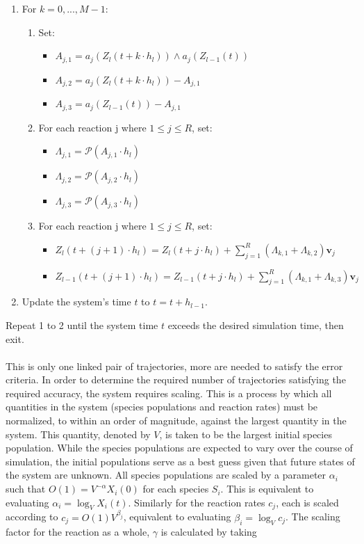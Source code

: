 \documentclass[ugrad,lot,lof,openright,11pt,oneside,onehalfspace]{RUthesis}
\begin{document}
		\begin{enumerate}
			\item For $k = 0,...,M-1$:
				\begin{enumerate}
				\item Set:
					\begin{itemize}
					\item $A_{j,1} = a_j(Z_l(t + k \cdot h_l)) \wedge a_j(Z_{l-1}(t))$
					\item $A_{j,2} = a_j(Z_l(t + k \cdot h_l)) - A_{j,1}$
					\item $A_{j,3} = a_j(Z_{l-1}(t)) - A_{j,1}$
					\end{itemize}
				\item For each reaction j where $1 \leq j \leq R$, set:
					\begin{itemize}
					\item $\Lambda_{j,1} = \mathcal{P}(A_{j,1} \cdot h_l)$
					\item $\Lambda_{j,2} = \mathcal{P}(A_{j,2} \cdot h_l)$
					\item $\Lambda_{j,3} = \mathcal{P}(A_{j,3} \cdot h_l)$
					\end{itemize}
				\item For each reaction j where $1 \leq j \leq R$, set:
					\begin{itemize}
					\item $Z_l(t + (j+1) \cdot h_l) = Z_l(t + j \cdot h_l) + \sum_{j=1}^R (\Lambda_{k,1} + \Lambda_{k,2}) \mathbf{v}_j$
					\item $Z_{l-1}(t + (j+1) \cdot h_l) = Z_{l-1}(t + j \cdot h_l) + \sum_{j=1}^R (\Lambda_{k,1} + \Lambda_{k,3}) \mathbf{v}_j$
					\end{itemize}
				\end{enumerate}
			\item Update the system's time $t$ to $t = t + h_{l-1}$.
		\end{enumerate}

		\noindent
		Repeat 1 to 2 until the system time $t$ exceeds the desired simulation time, then exit.\\
		\\
		This is only one linked pair of trajectories, more are needed to satisfy the error criteria. In order to determine the required number of trajectories satisfying the required accuracy, the system requires scaling. This is a process by which all quantities in the system (species populations and reaction rates) must be normalized, to within an order of magnitude, against the largest quantity in the system. This quantity, denoted by $V$, is taken to be the largest initial species population. While the species populations are expected to vary over the course of simulation, the initial populations serve as a best guess given that future states of the system are unknown. All species populations are scaled by a parameter $\alpha_i$ such that $O(1) = V^{-\alpha} X_i(0)$ for each species $S_i$. This is equivalent to evaluating $\alpha_i = \log_V {X_i(t)}$. Similarly for the reaction rates $c_j$, each is scaled according to $c_j = O(1)V^{\beta_j}$, equivalent to evaluating $\beta_i = \log_V {c_j}$. The scaling factor for the reaction as a whole, $\gamma$ is calculated by taking
\end{document}
